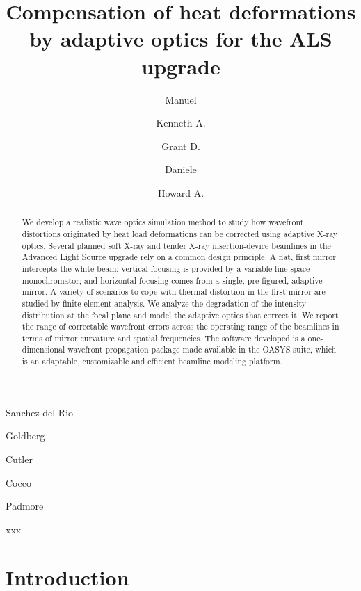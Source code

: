 \documentclass{iucr}              %
\begin{document}

\title{Compensation of heat deformations by adaptive optics for the ALS upgrade}

\author[a]{Manuel}{Sanchez del Rio}
\author[a]{Kenneth A.}{Goldberg}
\author[a]{Grant D.}{Cutler}
\author[a]{Daniele}{Cocco}
\author[a]{Howard A.}{Padmore}

 
\maketitle

\begin{synopsis}
xxx 
\end{synopsis}

\begin{abstract}
We develop a realistic wave optics simulation method to study how wavefront distortions originated by heat load deformations can be corrected using adaptive X-ray optics. Several planned soft X-ray and tender X-ray insertion-device beamlines in the Advanced Light Source upgrade rely on a common design principle. A flat, first mirror intercepts the white beam; vertical focusing is provided by a variable-line-space monochromator; and horizontal focusing comes from a single, pre-figured, adaptive mirror. 
A variety of scenarios to cope with thermal distortion in the first mirror are studied by finite-element analysis. We analyze the degradation of the intensity distribution at the focal plane and model the adaptive optics that correct it. We report the range of correctable wavefront errors across the operating range of the beamlines in terms of mirror curvature and spatial frequencies. The software developed is a one-dimensional wavefront propagation package made available in the OASYS suite, which is an adaptable, customizable and efficient beamline modeling platform.
\end{abstract}



\section{Introduction}
\label{sec:intro}  
\end{document}
